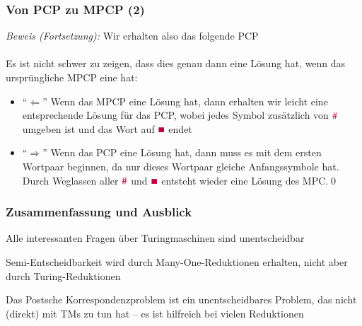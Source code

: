 \documentclass[onlymath]{beamer}
\begin{document}
\begin{frame}[t]\frametitle{Von PCP zu MPCP (2)}

% 

\emph{Beweis (Fortsetzung):} Wir erhalten also das folgende PCP\\[1ex]
\\[1ex]
%
Es ist nicht schwer zu zeigen, dass dies genau dann eine Lösung hat, wenn das ursprüngliche MPCP eine hat:\pause
\begin{itemize}
\item "`$\Leftarrow$"' Wenn das MPCP eine Lösung hat, dann erhalten wir leicht eine entsprechende Lösung für das PCP, wobei jedes Symbol zusätzlich von $\mathtt{\textcolor{purple}{\#}}$ umgeben ist und das Wort auf $\mathtt{\textcolor{purple}{\blacksquare}}$ endet\pause
\item "`$\Rightarrow$"' Wenn das PCP eine Lösung hat, dann muss es mit dem ersten Wortpaar beginnen, da nur dieses Wortpaar gleiche Anfangssymbole hat. Durch Weglassen aller $\mathtt{\textcolor{purple}{\#}}$ und 
$\mathtt{\textcolor{purple}{\blacksquare}}$ entsteht wieder eine Lösung des MPC.\qed
\end{itemize}

\end{frame}


\begin{frame}\frametitle{Zusammenfassung und Ausblick}

Alle interessanten Fragen über Turingmaschinen sind unentscheidbar\bigskip

\alert{Semi-Entscheidbarkeit} wird durch Many-One-Reduktionen erhalten, nicht aber durch Turing-Reduktionen\bigskip

Das \alert{Postsche Korrespondenzproblem} ist ein unentscheidbares Problem, das nicht (direkt) mit TMs zu tun hat -- es ist hilfreich bei vielen Reduktionen\bigskip


\end{frame}
\end{document}

